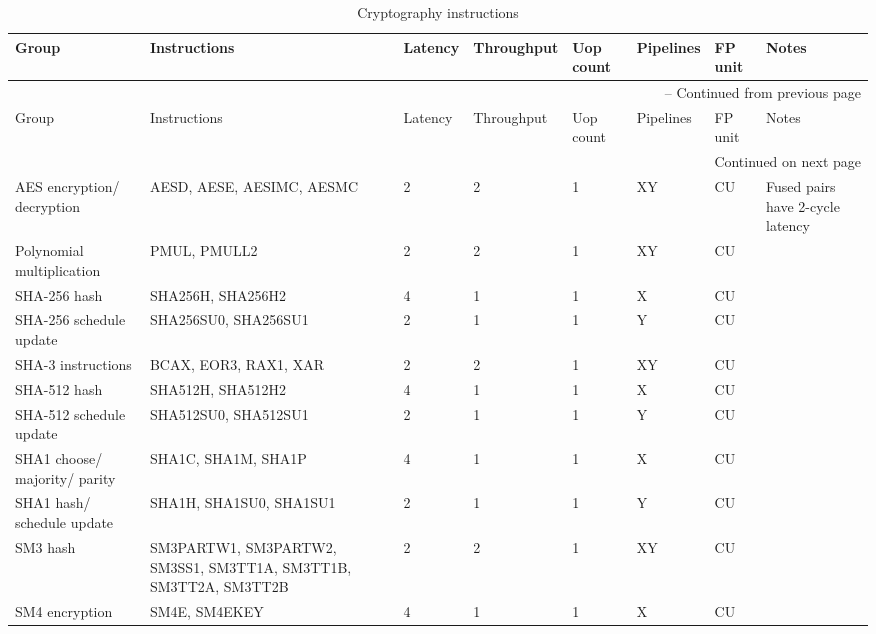 \begin{longtable}{|p{1in}|p{1in}|l|l|l|p{1in}|l|p{1in}|}
\caption{Cryptography instructions} \\
\hline
Group & Instructions & Latency & Throughput & Uop count & Pipelines & FP unit & Notes\\
\hline
\endfirsthead
\hline
\multicolumn{8}{|r|}{{\tablename\ \thetable{} -- Continued from previous page}} \\
\hline
Group & Instructions & Latency & Throughput & Uop count & Pipelines & FP unit & Notes\\
\hline
\endhead
\hline
\multicolumn{8}{|r|}{{Continued on next page}} \\
\hline
\endfoot
\hline
\endlastfoot
AES encryption/ decryption & AESD, AESE, AESIMC, AESMC & 2 & 2 & 1 & XY & CU & Fused pairs have 2-cycle latency\\
\hline
Polynomial multiplication & PMUL, PMULL{{2}} & 2 & 2 & 1 & XY & CU & \\
\hline
SHA-256 hash & SHA256H, SHA256H2 & 4 & 1 & 1 & X & CU & \\
\hline
SHA-256 schedule update & SHA256SU0, SHA256SU1 & 2 & 1 & 1 & Y & CU & \\
\hline
SHA-3 instructions & BCAX, EOR3, RAX1, XAR & 2 & 2 & 1 & XY & CU & \\
\hline
SHA-512 hash & SHA512H, SHA512H2 & 4 & 1 & 1 & X & CU & \\
\hline
SHA-512 schedule update & SHA512SU0, SHA512SU1 & 2 & 1 & 1 & Y & CU & \\
\hline
SHA1 choose/ majority/ parity & SHA1C, SHA1M, SHA1P & 4 & 1 & 1 & X & CU & \\
\hline
SHA1 hash/ schedule update & SHA1H, SHA1SU0, SHA1SU1 & 2 & 1 & 1 & Y & CU & \\
\hline
SM3 hash & SM3PARTW1, SM3PARTW2, SM3SS1, SM3TT1A, SM3TT1B, SM3TT2A, SM3TT2B & 2 & 2 & 1 & XY & CU & \\
\hline
SM4 encryption & SM4E, SM4EKEY & 4 & 1 & 1 & X & CU & \\
\hline
\end{longtable}
